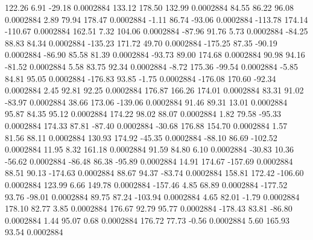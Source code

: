       122.26        6.91      -29.18     0.0002884
      133.12      178.50      132.99     0.0002884
       84.55       86.22       96.08     0.0002884
        2.89       79.94      178.47     0.0002884
       -1.11       86.74      -93.06     0.0002884
     -113.78      174.14     -110.67     0.0002884
      162.51        7.32      104.06     0.0002884
      -87.96       91.76        5.73     0.0002884
      -84.25       88.83       84.34     0.0002884
     -135.23      171.72       49.70     0.0002884
     -175.25       87.35      -90.19     0.0002884
      -86.90       85.58       81.39     0.0002884
      -93.73       89.00      174.68     0.0002884
       90.98       94.16      -81.52     0.0002884
        5.58       83.75       92.34     0.0002884
       -8.72      175.36      -99.54     0.0002884
       -5.85       84.81       95.05     0.0002884
     -176.83       93.85       -1.75     0.0002884
     -176.08      170.60      -92.34     0.0002884
        2.45       92.81       92.25     0.0002884
      176.87      166.26      174.01     0.0002884
       83.31       91.02      -83.97     0.0002884
       38.66      173.06     -139.06     0.0002884
       91.46       89.31       13.01     0.0002884
       95.87       84.35       95.12     0.0002884
      174.22       98.02       88.07     0.0002884
        1.82       79.58      -95.33     0.0002884
      174.33       87.81      -87.40     0.0002884
      -30.68      176.88      154.70     0.0002884
        1.57       81.56       88.11     0.0002884
      130.93      174.92      -45.35     0.0002884
      -88.10       86.69     -102.52     0.0002884
       11.95        8.32      161.18     0.0002884
       91.59       84.80        6.10     0.0002884
      -30.83       10.36      -56.62     0.0002884
      -86.48       86.38      -95.89     0.0002884
       14.91      174.67     -157.69     0.0002884
       88.51       90.13     -174.63     0.0002884
       88.67       94.37      -83.74     0.0002884
      158.81      172.42     -106.60     0.0002884
      123.99        6.66      149.78     0.0002884
     -157.46        4.85       68.89     0.0002884
     -177.52       93.76      -98.01     0.0002884
       89.75       87.24     -103.94     0.0002884
        4.65       82.01       -1.79     0.0002884
      178.10       82.77        3.85     0.0002884
      176.67       92.79       95.77     0.0002884
     -178.43       83.81      -86.80     0.0002884
        1.44       95.07        0.68     0.0002884
      176.72       77.73       -0.56     0.0002884
        5.60      165.93       93.54     0.0002884
